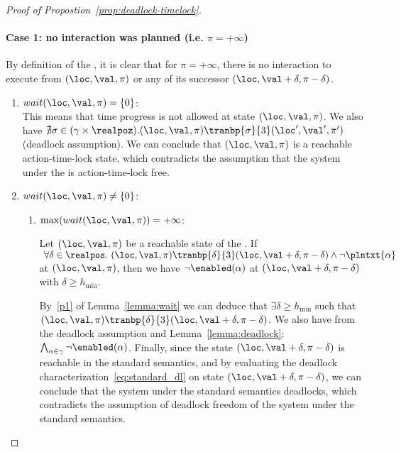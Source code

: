 \begin{proof}[Proof of Propostion~\ref{prop:deadlock-timelock}]
\paragraph*{Case 1: no interaction was planned (i.e. $\pi = +\infty$)}
By definition of the \lpsabrb, it is clear that for $\pi=+\infty$, there is no interaction to execute from
$(\loc,\val,\pi)$ or any of its successor $(\loc,\val+\delta,\pi-\delta)$.
\begin{enumerate}
  \item $wait(\loc,\val,\pi)=\{0\}$:\\
    This means that time progress is not allowed at state $(\loc,\val,\pi)$. We also have
    $\nexists\sigma\in(\gamma\times\realpoz).(\loc,\val,\pi)\tranbp{\sigma}{3}(\loc',\val',\pi')$ (deadlock assumption). We can conclude
    that $(\loc,\val,\pi)$ is a reachable action-time-lock state, which contradicts the assumption that the system under the \lps is action-time-lock free.
  \item $wait(\loc,\val,\pi)\neq\{0\}$:
    \begin{enumerate}
      \item $\max(wait(\loc,\val,\pi))=+\infty$:\\
        \begin{lemma}\label{lemma:deadlock}
        Let $(\loc,\val,\pi)$ be a reachable state of the \lps. 
        If $ \ \forall\delta\in\realpos. \ (\loc,\val,\pi)\tranbp{\delta}{3}(\loc,\val+\delta,\pi-\delta)\wedge\neg\plntxt{\alpha}$ at $(\loc,\val,\pi)$,
        then we have $\neg\enabled(\alpha)$ at $(\loc,\val+\delta,\pi-\delta)$ with $\delta\ge h_{\min}$.
      \end{lemma}
      By~\ref{p1} of Lemma~\ref{lemma:wait} we can deduce that $\exists\delta\ge h_{\min}$ such that $(\loc,\val,\pi)\tranbp{\delta}{3}(\loc,\val+\delta,\pi-\delta)$. 
      We also have from the deadlock assumption and Lemma~\ref{lemma:deadlock}:
        $\bigwedge_{\alpha\in\gamma}\neg\enabled(\alpha)$. Finally, since the state $(\loc,\val+\delta,\pi-\delta)$ is reachable in the standard
        semantics, and by evaluating the deadlock characterization~\ref{eq:standard_dl} on state $(\loc,\val+\delta,\pi-\delta)$, 
        we can conclude that the system under the standard semantics deadlocks, which contradicts the assumption of deadlock freedom of the system under the standard semantics.

\end{enumerate}
\end{enumerate}
\end{proof}
